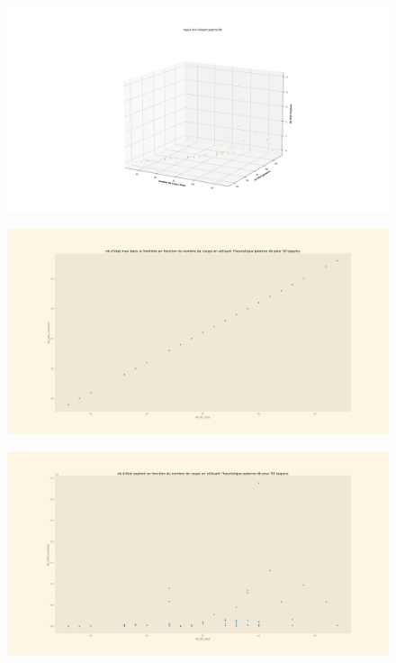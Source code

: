 \documentclass[a4paper, 12pt]{article}
\begin{document}
\begin{figure}[H]
    \centering
    \includegraphics[width=\textwidth]{Taquin 4x4 pa_db graphe 3d}
\end{figure}
\begin{figure}[H]
    \centering
    \includegraphics[width=\textwidth]{Taquin 4x4 pa_db nb de etat dans la frontiere en fonction du nb de coups}
\end{figure}
\begin{figure}[H]
    \centering
    \includegraphics[width=\textwidth]{Taquin 4x4 pa_db nb de noeud exploere en fonction du nombre de coups}
\end{figure}
\end{document}
